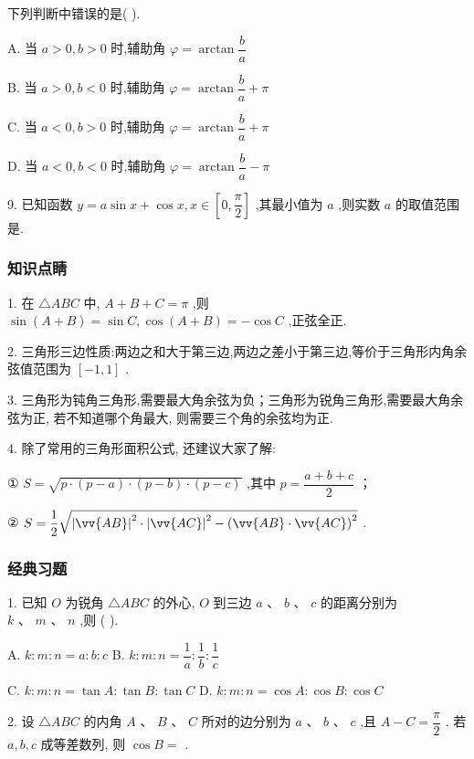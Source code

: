 下列判断中错误的是(   ).

A. 当 $a > 0,b > 0$ 时,辅助角 $\varphi  = \arctan \dfrac{b}{a}$

B. 当 $a > 0,b < 0$ 时,辅助角 $\varphi  = \arctan \dfrac{b}{a} + \pi$

C. 当 $a < 0,b > 0$ 时,辅助角 $\varphi  = \arctan \dfrac{b}{a} + \pi$

D. 当 $a < 0,b < 0$ 时,辅助角 $\varphi  = \arctan \dfrac{b}{a} - \pi$

9. 已知函数 $y = a\sin x + \cos x,x \in  \left\lbrack  {0,\dfrac{\pi }{2}}\right\rbrack$ ,其最小值为 $a$ ,则实数 $a$ 的取值范围是\blkda{}.

\subsubsection*{知识点睛}

1. 在 $\bigtriangleup {ABC}$ 中, $A + B + C = \pi$ ,则 $\sin \left( {A + B}\right)  = \sin C,\cos \left( {A + B}\right)  =  - \cos C$ ,正弦全正.

2. 三角形三边性质:两边之和大于第三边,两边之差小于第三边,等价于三角形内角余弦值范围为 $\left\lbrack  {-1,1}\right\rbrack$ .

3. 三角形为钝角三角形,需要最大角余弦为负；三角形为锐角三角形,需要最大角余弦为正, 若不知道哪个角最大, 则需要三个角的余弦均为正.

4. 除了常用的三角形面积公式, 还建议大家了解:

① $S = \sqrt{p \cdot  \left( {p - a}\right)  \cdot  \left( {p - b}\right)  \cdot  \left( {p - c}\right) }$ ,其中 $p = \dfrac{a + b + c}{2}$ ；

② $S = \dfrac{1}{2}\sqrt{{\left| \vv{AB}\right| }^{2} \cdot  {\left| \vv{AC}\right| }^{2} - {\left( \vv{AB} \cdot  \vv{AC}\right) }^{2}}$ .

\subsubsection*{经典习题}

1. 已知 $O$ 为锐角 $\bigtriangleup {ABC}$ 的外心, $O$ 到三边 $a\text{ 、 }b\text{ 、 }c$ 的距离分别为 $k\text{ 、 }m\text{ 、 }n$ ,则 (   ).

A. $k : m : n = a : b : c$ B. $k : m : n = \dfrac{1}{a} : \dfrac{1}{b} : \dfrac{1}{c}$

C. $k : m : n = \tan A : \tan B : \tan C$ D. $k : m : n = \cos A : \cos B : \cos C$

2. 设 $\bigtriangleup {ABC}$ 的内角 $A\text{ 、 }B\text{ 、 }C$ 所对的边分别为 $a\text{ 、 }b\text{ 、 }c$ ,且 $A - C = \dfrac{\pi }{2}$ . 若 $a,b,c$ 成等差数列, 则 $\cos B =$ \blkda{}.

